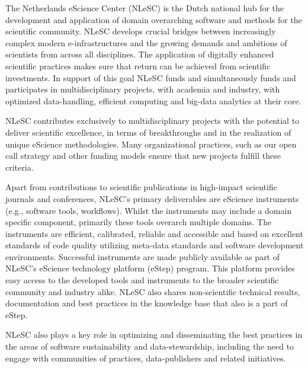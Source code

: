 \documentclass[a4paper,UKenglish]{dagrep}
\begin{document}


The Netherlands eScience Center (NLeSC) is the Dutch national hub for
the development and application of domain overarching software and
methods for the scientific community. NLeSC develops crucial bridges
between increasingly complex modern e-infrastructures and the growing
demands and ambitions of scientists from across all disciplines. The
application of digitally enhanced scientific practices makes sure that
return can be achieved from scientific investments. In support of this
goal NLeSC funds and simultaneously funds and participates in
multidisciplinary projects, with academia and industry, with optimized
data-handling, efficient computing and big-data analytics at their
core.

NLeSC contributes exclusively to multidisciplinary projects with the
potential to deliver scientific excellence, in terms of breakthroughs
and in the realization of unique eScience methodologies. Many
organizational practices, such as our open call strategy and other
funding models ensure that new projects fulfill these criteria.

Apart from contributions to scientific publications in high-impact
scientific journals and conferences, NLeSC’s primary deliverables are
eScience instruments (e.g., software tools, workflows). Whilst the
instruments may include a domain specific component, primarily these
tools overarch multiple domains. The instruments are efficient,
calibrated, reliable and accessible and based on excellent standards
of code quality utilizing meta-data standards and software development
environments. Successful instruments are made publicly available as
part of NLeSC’s eScience technology platform (eStep) program. This
platform provides easy access to the developed tools and instruments
to the broader scientific community and industry alike. NLeSC also
shares non-scientific technical results, documentation and best
practices in the knowledge base that also is a part of eStep.

NLeSC also plays a key role in optimizing and disseminating the best
practices in the areas of software sustainability and
data-stewardship, including the need to engage with communities of
practices, data-publishers and related initiatives.
\end{document}
